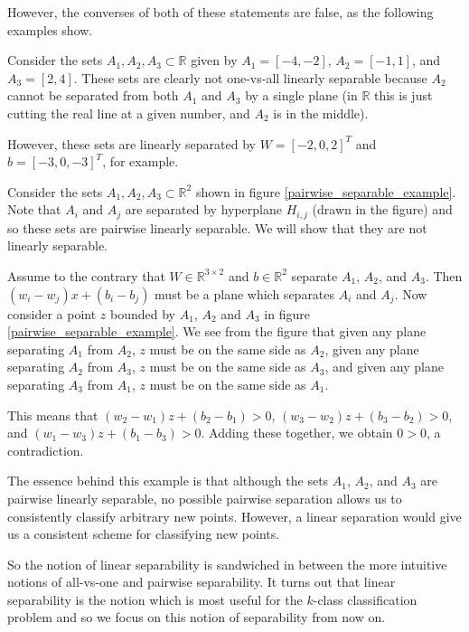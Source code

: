 However, the converses of both of these statements are false, as the following examples show.
\begin{example}
 Consider the sets $A_1, A_2, A_3\subset \mathbb{R}$ given by $A_1 = [-4,-2]$, $A_2 = [-1,1]$, and $A_3 = [2,4]$. These
 sets are clearly not one-vs-all linearly separable because $A_2$ cannot be separated from both $A_1$ and $A_3$ by a single
 plane (in $\mathbb{R}$ this is just cutting the real line at a given number, and $A_2$ is in the middle).
 
 However, these sets are linearly separated by $W = [-2,0,2]^T$ and $b = [-3,0,-3]^T$, for example.
\end{example}
\begin{example}
Consider the sets $A_1, A_2, A_3\subset \mathbb{R}^2$ shown in figure \ref{pairwise_separable_example}.
Note that $A_i$ and $A_j$ are separated by hyperplane $H_{i,j}$ (drawn in the figure) and so these sets are
pairwise linearly separable. We will show that they are not linearly separable.

Assume to the contrary that $W\in \mathbb{R}^{3\times 2}$ and $b\in \mathbb{R}^2$ separate $A_1$, $A_2$, and $A_3$. Then
$(w_i - w_j)x + (b_i - b_j)$ must be a plane which separates $A_i$ and $A_j$. Now consider a point $z$ bounded by $A_1$, $A_2$ and $A_3$ in figure 
\ref{pairwise_separable_example}. We see from the figure that given any plane separating $A_1$ from $A_2$, $z$ must
be on the same side as $A_2$, given any plane separating $A_2$ from $A_3$, $z$ must be on the same side as
$A_3$, and given any plane separating $A_3$ from $A_1$, $z$ must be on the same side as $A_1$.

This means that $(w_2 - w_1)z + (b_2 - b_1) > 0$, $(w_3 - w_2)z + (b_3 - b_2) > 0$, and
$(w_1 - w_3)z + (b_1 - b_3) > 0$. Adding these together, we obtain $0 > 0$, a contradiction.

The essence behind this example is that although the sets $A_1$, $A_2$, and $A_3$ are pairwise linearly separable, 
no possible pairwise separation allows us to consistently classify arbitrary new points. However, a linear separation
would give us a consistent scheme for classifying new points.

\end{example}

So the notion of linear separability is sandwiched in between the more
intuitive notions of all-vs-one and pairwise separability. It turns
out that linear separability is the notion which is most useful for
the $k$-class classification problem and so we focus on this notion of
separability from now on.



